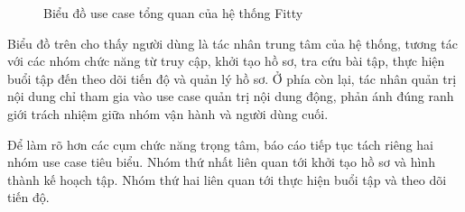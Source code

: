 \begin{figure}[H]
{
}
\caption{Biểu đồ use case tổng quan của hệ thống Fitty}
\label{fig:data-overview}
\end{figure}

Biểu đồ trên cho thấy người dùng là tác nhân trung tâm của hệ thống, tương tác với các nhóm chức năng từ truy cập, khởi tạo hồ sơ, tra cứu bài tập, thực hiện buổi tập đến theo dõi tiến độ và quản lý hồ sơ. Ở phía còn lại, tác nhân quản trị nội dung chỉ tham gia vào use case quản trị nội dung động, phản ánh đúng ranh giới trách nhiệm giữa nhóm vận hành và người dùng cuối.

Để làm rõ hơn các cụm chức năng trọng tâm, báo cáo tiếp tục tách riêng hai nhóm use case tiêu biểu. Nhóm thứ nhất liên quan tới khởi tạo hồ sơ và hình thành kế hoạch tập. Nhóm thứ hai liên quan tới thực hiện buổi tập và theo dõi tiến độ.

